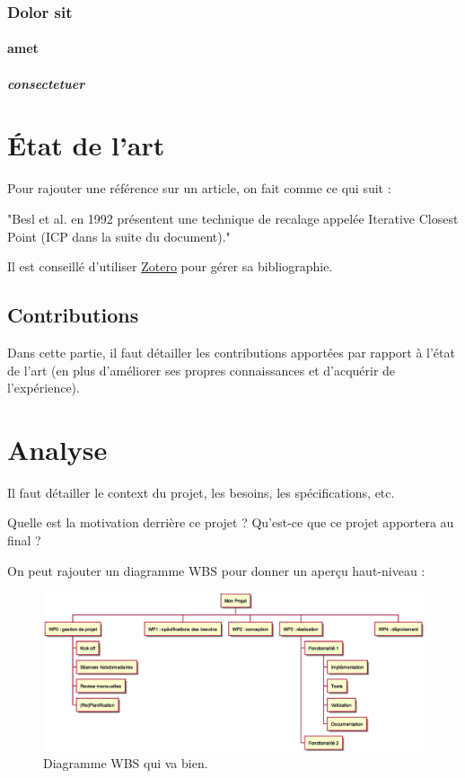 \subsection{Dolor sit}
\lipsum[1-1] %
\subsubsection{amet}
\lipsum[1-1] %
\paragraph{consectetuer}
\lipsum[1-1] %

\chapter{État de l'art}
Pour rajouter une référence sur un article, on fait comme ce qui suit :

"Besl et al. en 1992 \cite{besl_method_1992} présentent une technique de recalage appelée Iterative Closest Point (ICP dans la suite du document)."

Il est conseillé d'utiliser \href{https://www.zotero.org/}{Zotero} pour gérer sa bibliographie.

\section{Contributions}
Dans cette partie, il faut détailler les contributions apportées par rapport à l'état de l'art (en plus d'améliorer ses propres connaissances et d'acquérir de l'expérience).

\chapter{Analyse}
Il faut détailler le context du projet, les besoins, les spécifications, etc.

Quelle est la motivation derrière ce projet ? Qu'est-ce que ce projet apportera au final ?

On peut rajouter un diagramme WBS pour donner un aperçu haut-niveau :
\begin{figure}[h]
    \centering
    \includegraphics[width=\textwidth]{./images/WBS_Exemple.eps}
    \caption{Diagramme WBS qui va bien.}
\end{figure}

